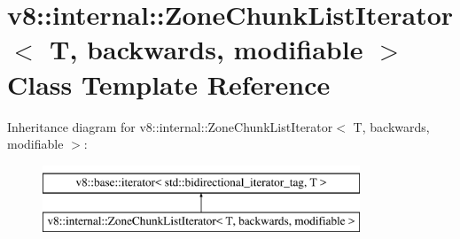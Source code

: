 \hypertarget{classv8_1_1internal_1_1ZoneChunkListIterator}{}\section{v8\+:\+:internal\+:\+:Zone\+Chunk\+List\+Iterator$<$ T, backwards, modifiable $>$ Class Template Reference}
\label{classv8_1_1internal_1_1ZoneChunkListIterator}
Inheritance diagram for v8\+:\+:internal\+:\+:Zone\+Chunk\+List\+Iterator$<$ T, backwards, modifiable $>$\+:\begin{figure}[H]
\begin{center}
\leavevmode
\includegraphics[height=2.000000cm]{classv8_1_1internal_1_1ZoneChunkListIterator}
\end{center}
\end{figure}
